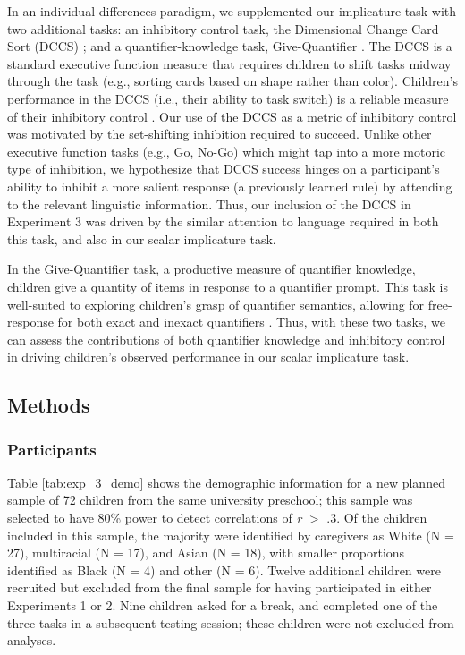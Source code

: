 \documentclass[man]{apa2}
\begin{document}
In an individual differences paradigm, we supplemented our implicature task with two additional tasks: an inhibitory control task, the Dimensional Change Card Sort (DCCS) ; and a quantifier-knowledge task, Give-Quantifier . The DCCS is a standard executive function measure that requires children to shift tasks midway through the task (e.g., sorting cards based on shape rather than color). Children's performance in the DCCS (i.e., their ability to task switch) is a reliable measure of their inhibitory control . Our use of the DCCS as a metric of inhibitory control was motivated by the set-shifting inhibition required to succeed. Unlike other executive function tasks (e.g., Go, No-Go) which might tap into a more motoric type of inhibition, we hypothesize that DCCS success hinges on a participant's ability to inhibit a more salient response (a previously learned rule) by attending to the relevant linguistic information. Thus, our inclusion of the DCCS in Experiment 3 was driven by the similar attention to language required in both this task, and also in our scalar implicature task.

In the Give-Quantifier task, a productive measure of quantifier knowledge, children give a quantity of items in response to a quantifier prompt. This task is well-suited to exploring children's grasp of quantifier semantics, allowing for free-response for both exact and inexact quantifiers \cite{barner2009}. Thus, with these two tasks, we can assess the contributions of both quantifier knowledge and inhibitory control in driving children's observed performance in our scalar implicature task.

\subsection{Methods}

\subsubsection{Participants}

Table \ref{tab:exp_3_demo} shows the demographic information for a new planned sample of 72 children from the same university preschool; this sample was selected to have 80\% power to detect correlations of \emph{r} $>$ .3. Of the children included in this sample, the majority were identified by caregivers as White (N = 27), multiracial (N = 17), and Asian (N = 18), with smaller proportions identified as Black (N = 4) and other (N = 6). Twelve additional children were recruited but excluded from the final sample for having participated in either Experiments 1 or 2. Nine children asked for a break, and completed one of the three tasks in a subsequent testing session; these children were not excluded from analyses.
\end{document}
